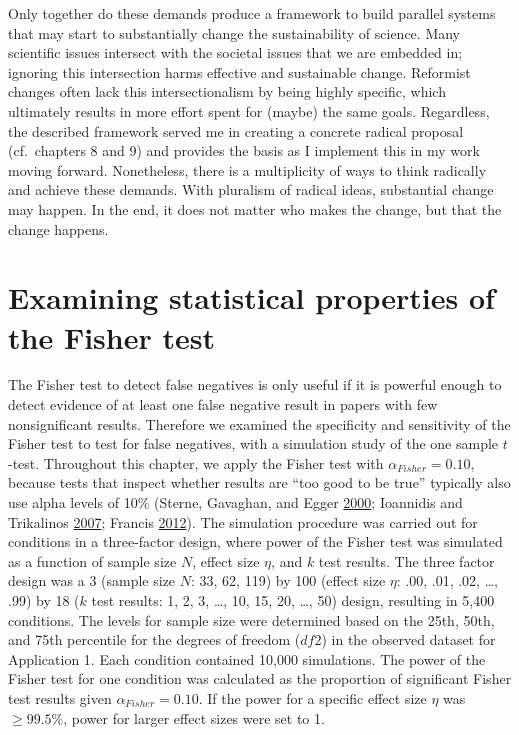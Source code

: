 \documentclass[a5paper]{book}
\begin{document}
Only together do these demands produce a framework to build parallel
systems that may start to substantially change the sustainability of
science. Many scientific issues intersect with the societal issues that
we are embedded in; ignoring this intersection harms effective and
sustainable change. Reformist changes often lack this intersectionalism
by being highly specific, which ultimately results in more effort spent
for (maybe) the same goals. Regardless, the described framework served
me in creating a concrete radical proposal (cf.~chapters 8 and 9) and
provides the basis as I implement this in my work moving forward.
Nonetheless, there is a multiplicity of ways to think radically and
achieve these demands. With pluralism of radical ideas, substantial
change may happen. In the end, it does not matter who makes the change,
but that the change happens.

\appendix


\chapter{Examining statistical properties of the Fisher
test}\label{examining-statistical-properties-of-the-fisher-test}

The Fisher test to detect false negatives is only useful if it is
powerful enough to detect evidence of at least one false negative result
in papers with few nonsignificant results. Therefore we examined the
specificity and sensitivity of the Fisher test to test for false
negatives, with a simulation study of the one sample \(t\)-test.
Throughout this chapter, we apply the Fisher test with
\(\alpha_{Fisher}=0.10\), because tests that inspect whether results are
\enquote{too good to be true} typically also use alpha levels of 10\%
(Sterne, Gavaghan, and Egger
\protect\hyperlink{ref-doi:10.1016ux2fs0895-43560000242-0}{2000};
Ioannidis and Trikalinos
\protect\hyperlink{ref-doi:10.1177ux2f1740774507079441}{2007}; Francis
\protect\hyperlink{ref-doi:10.3758ux2fs13423-012-0227-9}{2012}). The
simulation procedure was carried out for conditions in a three-factor
design, where power of the Fisher test was simulated as a function of
sample size \(N\), effect size \(\eta\), and \(k\) test results. The
three factor design was a 3 (sample size \(N\): 33, 62, 119) by 100
(effect size \(\eta\): .00, .01, .02, \ldots{}, .99) by 18 (\(k\) test
results: 1, 2, 3, \ldots{}, 10, 15, 20, \ldots{}, 50) design, resulting
in 5,400 conditions. The levels for sample size were determined based on
the 25th, 50th, and 75th percentile for the degrees of freedom (\(df2\))
in the observed dataset for Application 1. Each condition contained
10,000 simulations. The power of the Fisher test for one condition was
calculated as the proportion of significant Fisher test results given
\(\alpha_{Fisher}=0.10\). If the power for a specific effect size
\(\eta\) was \(\geq99.5\%\), power for larger effect sizes were set to
1.
\end{document}

